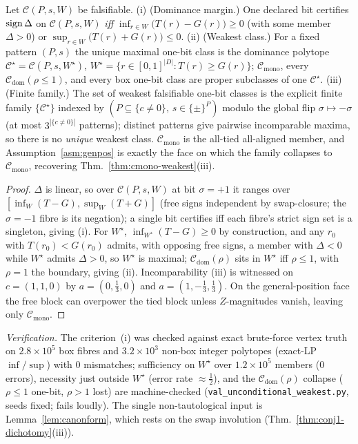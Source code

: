 \begin{theorem}\label{thm:uncond-weakest}
Let $\mathcal C(P,s,W)$ be falsifiable. \textnormal{(i) (Dominance margin.)} One declared bit
certifies $\operatorname{sign}\Delta$ on $\mathcal C(P,s,W)$ \emph{iff}
$\inf_{r\in W}\!\big(T(r)-G(r)\big)\ge0$ (with some member $\Delta>0$) or
$\sup_{r\in W}\!\big(T(r)+G(r)\big)\le0$. \textnormal{(ii) (Weakest class.)} For a fixed pattern
$(P,s)$ the unique maximal one-bit class is the dominance polytope
$\mathcal C^\star=\mathcal C(P,s,W^\star)$, $W^\star=\{r\in[0,1]^{|D|}:T(r)\ge G(r)\}$;
$\mathcal C_{\mathrm{mono}}$, every $\mathcal C_{\mathrm{dom}}(\rho\le1)$, and every box one-bit
class are proper subclasses of one $\mathcal C^\star$. \textnormal{(iii) (Finite family.)} The set
of weakest falsifiable one-bit classes is the explicit finite family $\{\mathcal C^\star\}$ indexed
by $(P\subseteq\{c\neq0\},\,s\in\{\pm\}^{P})$ modulo the global flip $\sigma\mapsto-\sigma$ (at most
$3^{|\{c\neq0\}|}$ patterns); distinct patterns give pairwise incomparable maxima, so there is no
\emph{unique} weakest class. $\mathcal C_{\mathrm{mono}}$ is the all-tied all-aligned member, and
Assumption~\ref{asm:genpos} is exactly the face on which the family collapses to
$\mathcal C_{\mathrm{mono}}$, recovering Thm.~\ref{thm:cmono-weakest}(iii).
\end{theorem}
\begin{proof}
$\Delta$ is linear, so over $\mathcal C(P,s,W)$ at bit $\sigma=+1$ it ranges over
$[\inf_W(T-G),\sup_W(T+G)]$ (free signs independent by swap-closure; the $\sigma=-1$ fibre is its
negation); a single bit certifies iff each fibre's strict sign set is a singleton, giving (i). For
$W^\star$, $\inf_{W^\star}(T-G)\ge0$ by construction, and any $r_0$ with $T(r_0)<G(r_0)$ admits,
with opposing free signs, a member with $\Delta<0$ while $W^\star$ admits $\Delta>0$, so $W^\star$
is maximal; $\mathcal C_{\mathrm{dom}}(\rho)$ sits in $W^\star$ iff $\rho\le1$, with $\rho=1$ the
boundary, giving (ii). Incomparability (iii) is witnessed on $c=(1,1,0)$ by $a=(0,\tfrac13,0)$ and
$a=(1,-\tfrac13,\tfrac13)$. On the general-position face the free block can overpower the tied block
unless $Z$-magnitudes vanish, leaving only $\mathcal C_{\mathrm{mono}}$.
\end{proof}

\noindent\emph{Verification.} The criterion~(i) was checked against exact brute-force vertex truth
on $2.8{\times}10^{5}$ box fibres and $3.2{\times}10^{3}$ non-box integer polytopes (exact-LP
$\inf/\sup$) with $0$ mismatches; sufficiency on $W^\star$ over $1.2{\times}10^{5}$ members
($0$ errors), necessity just outside $W^\star$ (error rate $\approx\tfrac12$), and the
$\mathcal C_{\mathrm{dom}}(\rho)$ collapse ($\rho{\le}1$ one-bit, $\rho{>}1$ lost) are
machine-checked (\texttt{val\_unconditional\_weakest.py}, seeds fixed; fails loudly). The single
non-tautological input is Lemma~\ref{lem:canonform}, which rests on the swap involution
(Thm.~\ref{thm:conj1-dichotomy}(iii)).
